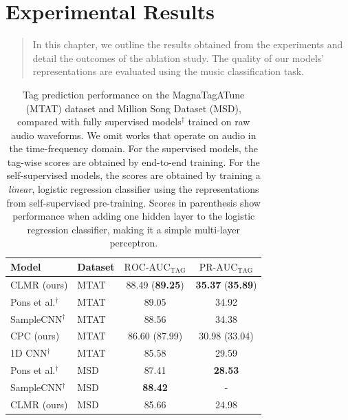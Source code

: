 \chapter{Experimental Results}\label{sec:results}

\begin{quote}
    In this chapter, we outline the results obtained from the experiments and detail the outcomes of the ablation study. The quality of our models' representations are evaluated using the music classification task.
\end{quote}

\begin{table}
    \centering
    \begin{tabular}{@{}llcc@{}}\toprule
        Model & Dataset & $\text{ROC-AUC}_\text{TAG}$ & $\text{PR-AUC}_\text{TAG}$ \\ \midrule
        CLMR (ours) & MTAT & 88.49 (\textbf{89.25}) & \textbf{35.37} (\textbf{35.89}) \\
        Pons et al.$^\dagger$ & MTAT & 89.05 & 34.92 \\
        SampleCNN$^\dagger$ & MTAT & 88.56 & 34.38 \\
        CPC (ours) & MTAT & 86.60 (87.99) & 30.98 (33.04) \\
        1D CNN$^\dagger$ & MTAT & 85.58 & 29.59 \\\midrule
        Pons et al.$^\dagger$ & MSD & 87.41 & \textbf{28.53} \\
        SampleCNN$^\dagger$ & MSD & \textbf{88.42} & - \\
        CLMR (ours) & MSD & 85.66 & 24.98 \\
        \bottomrule
    \end{tabular}
    \caption{Tag prediction performance on the MagnaTagATune (MTAT) dataset and Million Song Dataset (MSD), compared with fully supervised models$^\dagger$ trained on raw audio waveforms.
    We omit works that operate on audio in the time-frequency domain.
For the supervised models, the tag-wise scores are obtained by end-to-end training.
For the self-supervised models, the scores are obtained by training a \emph{linear}, logistic regression classifier using the representations from self-supervised pre-training.
Scores in parenthesis show performance when adding one hidden layer to the logistic regression classifier, making it a simple multi-layer perceptron.}
    \label{tab:results}
\end{table}


